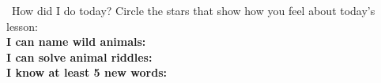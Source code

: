 \vspace{1em}
\begin{grammartip}{ \ How did I do today?}
  Circle the stars that show how you feel about today's lesson:\\[6pt]
  \textbf{I can name wild animals:} \selfcheck[0] \\[4pt]
  \textbf{I can solve animal riddles:} \selfcheck[0] \\[4pt]
  \textbf{I know at least 5 new words:} \selfcheck[0]
\end{grammartip}
